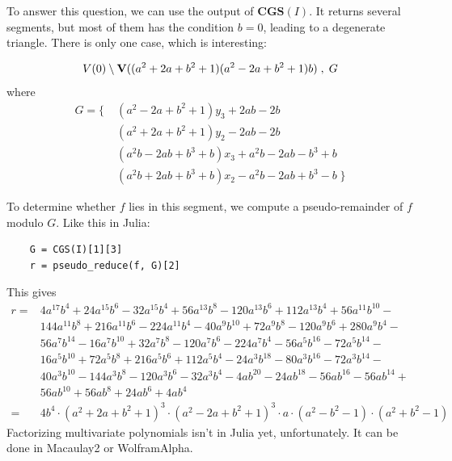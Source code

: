 \begin{example}
  To answer this question, we can use the output of $\mathbf{CGS}(I)$. It returns several segments, but most of them has the condition $b = 0$, leading to a degenerate triangle. There is only one case, which is interesting:

  \[V(0) \setminus \operatorname{\mathbf V}((a^{2} + 2a + b^{2} + 1)(a^{2} - 2a + b^{2} + 1)b)\;, \; G\] where
  \begin{align*}
 G = \{\; &(a^2 - 2a + b^2 + 1)y_3 + 2ab - 2b \\
          &(a^2 + 2a + b^2 + 1)y_2 - 2ab - 2b \\
          &(a^2b - 2ab + b^3 + b)x_3 + a^2b - 2ab - b^3 + b \\
          &(a^2b + 2ab + b^3 + b)x_2 - a^2b - 2ab + b^3 - b \; \}
  \end{align*}

  To determine whether $f$ lies in this segment, we compute a pseudo-remainder of $f$ modulo $G$. Like this in Julia:

  \begin{verbatim}
    G = CGS(I)[1][3]
    r = pseudo_reduce(f, G)[2]
  \end{verbatim}
  This gives
  \begin{align*}
    r = &4 a^{17} b^4 + 24 a^{15} b^6 - 32 a^{15} b^4 + 56 a^{13} b^8 - 120 a^{13} b^6 + 112 a^{13} b^4 + 56 a^{11} b^{10} - \\
        &144 a^{11} b^8 + 216 a^{11} b^6 - 224 a^{11} b^4 - 40 a^9 b^{10} + 72 a^9 b^8 - 120 a^9 b^6 + 280 a^9 b^4 - \\
        &56 a^7 b^{14} - 16 a^7 b^{10} + 32 a^7 b^8 - 120 a^7 b^6 - 224 a^7 b^4 - 56 a^5 b^{16} - 72 a^5 b^{14} - \\
        &16 a^5 b^{10} + 72 a^5 b^8 + 216 a^5 b^6 + 112 a^5 b^4 - 24 a^3 b^{18} - 80 a^3 b^{16} - 72 a^3 b^{14} - \\
        &40 a^3 b^{10} - 144 a^3 b^8 - 120 a^3 b^6 - 32 a^3 b^4 - 4 a b^{20} - 24 a b^{18} - 56 a b^{16} - 56 a b^{14} + \\
        &56 a b^{10} + 56 a b^8 + 24 a b^6 + 4 a b^4 \\
    = &4 b^{4}\cdot (a^{2} + 2a + b^{2} + 1)^{3} \cdot (a^{2} - 2a + b^{2} + 1)^{3} \cdot a \cdot (a^{2} - b^{2} - 1) \cdot (a^{2} + b^{2} - 1)
  \end{align*}
  Factorizing multivariate polynomials isn't in Julia yet, unfortunately. It can be done in Macaulay2 or WolframAlpha.


\end{example}
